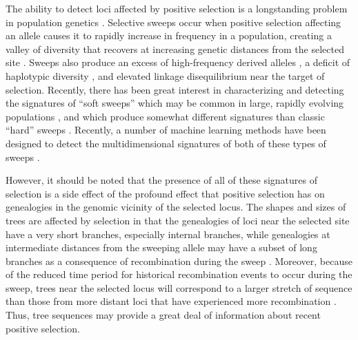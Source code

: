 The ability to detect loci affected by positive selection is a longstanding problem in population genetics \cite{stephanSelectiveSweeps2019}. Selective sweeps occur when positive selection affecting an allele causes it to rapidly increase in frequency in a population, creating a valley of diversity that recovers at increasing genetic distances from the selected site \cite{kaplanHitchhikingEffectRevisited1989,smithHitchhikingEffectFavourable1974}. Sweeps also produce an excess of high-frequency derived alleles \cite{fayHitchhikingPositiveDarwinian2000}, a deficit of haplotypic diversity \cite{fayHitchhikingPositiveDarwinian2000,hudsonEvidencePositiveSelection1994,sabetiDetectingRecentPositive2002}, and elevated linkage disequilibrium \cite{kellyTestNeutralityBased1997,kimLinkageDisequilibriumSignature2004} near the target of selection. Recently, there has been great interest in characterizing and detecting the signatures of “soft sweeps” \cite{hermissonSoftSweepsUnderstanding2017} which may be common in large, rapidly evolving populations \cite{garudRecentSelectiveSweeps2015,hermissonSoftSweeps2005,karasovEvidenceThatAdaptation2010}, and which produce somewhat different signatures than classic “hard” sweeps \cite{bergCoalescentModelSweep2015,przeworskiSignaturePositiveSelection2005}. Recently, a number of machine learning methods have been designed to detect the multidimensional signatures of both of these types of sweeps \cite{caldasInferenceSelectiveSweep2022,hejaseDeepLearningApproachInference2022,lauterburVersatileDetectionDiverse2022,mughalLocalizingClassifyingAdaptive2019,pybusHierarchicalBoostingMachinelearning2015,schriderHICRobustIdentification2016,whitehouseTimesweeperAccuratelyIdentifying2022,whitehouseTimesweeperAccuratelyIdentifying2023}. 

However, it should be noted that the presence of all of these signatures of selection is a side effect of the profound effect that positive selection has on genealogies in the genomic vicinity of the selected locus. The shapes and sizes of trees are affected by selection in that the genealogies of loci near the selected site have a very short branches, especially internal branches, while genealogies at intermediate distances from the sweeping allele may have a subset of long branches as a consequence of recombination during the sweep \cite{fayHitchhikingPositiveDarwinian2000,przeworskiSignaturePositiveSelection2005,stephanSelectiveSweeps2019}. Moreover, because of the reduced time period for historical recombination events to occur during the sweep, trees near the selected locus will correspond to a larger stretch of sequence than those from more distant loci that have experienced more recombination \cite{degiorgioSpatiallyAwareLikelihood2022,ferrer-admetllaDetectingIncompleteSoft2014,przeworskiSignaturePositiveSelection2005,sabetiDetectingRecentPositive2002}. Thus, tree sequences may provide a great deal of information about recent positive selection. 

